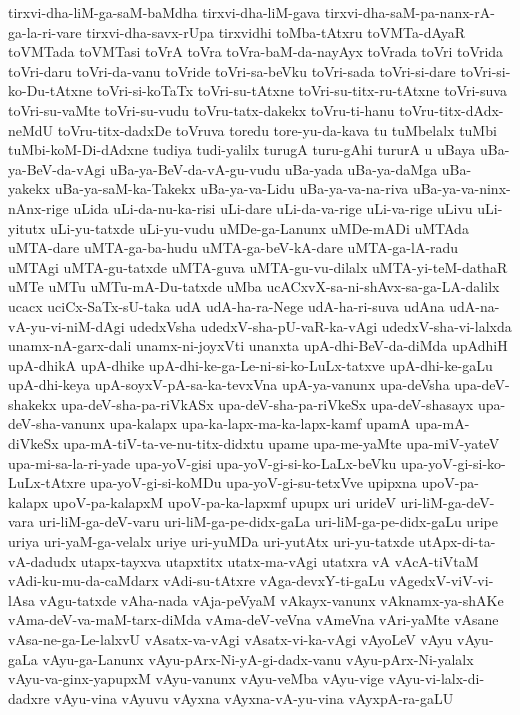 {tirxvi-dha-liM-ga-saM-baMdha
tirxvi-dha-liM-gava
tirxvi-dha-saM-pa-nanx-rA-ga-la-ri-vare
tirxvi-dha-savx-rUpa
tirxvidhi
toMba-tAtxru
toVMTa-dAyaR
toVMTada
toVMTasi
toVrA
toVra
toVra-baM-da-nayAyx
toVrada
toVri
toVrida
toVri-daru
toVri-da-vanu
toVride
toVri-sa-beVku
toVri-sada
toVri-si-dare
toVri-si-ko-Du-tAtxne
toVri-si-koTaTx
toVri-su-tAtxne
toVri-su-titx-ru-tAtxne
toVri-suva
toVri-su-vaMte
toVri-su-vudu
toVru-tatx-dakekx
toVru-ti-hanu
toVru-titx-dAdx-neMdU
toVru-titx-dadxDe
toVruva
toredu
tore-yu-da-kava
tu
tuMbelalx
tuMbi
tuMbi-koM-Di-dAdxne
tudiya
tudi-yalilx
turugA
turu-gAhi
tururA
u
uBaya
uBa-ya-BeV-da-vAgi
uBa-ya-BeV-da-vA-gu-vudu
uBa-yada
uBa-ya-daMga
uBa-yakekx
uBa-ya-saM-ka-Takekx
uBa-ya-va-Lidu
uBa-ya-va-na-riva
uBa-ya-va-ninx-nAnx-rige
uLida
uLi-da-nu-ka-risi
uLi-dare
uLi-da-va-rige
uLi-va-rige
uLivu
uLi-yitutx
uLi-yu-tatxde
uLi-yu-vudu
uMDe-ga-Lanunx
uMDe-mADi
uMTAda
uMTA-dare
uMTA-ga-ba-hudu
uMTA-ga-beV-kA-dare
uMTA-ga-lA-radu
uMTAgi
uMTA-gu-tatxde
uMTA-guva
uMTA-gu-vu-dilalx
uMTA-yi-teM-dathaR
uMTe
uMTu
uMTu-mA-Du-tatxde
uMba
ucACxvX-sa-ni-shAvx-sa-ga-LA-dalilx
ucacx
uciCx-SaTx-sU-taka
udA
udA-ha-ra-Nege
udA-ha-ri-suva
udAna
udA-na-vA-yu-vi-niM-dAgi
udedxVsha
udedxV-sha-pU-vaR-ka-vAgi
udedxV-sha-vi-lalxda
unamx-nA-garx-dali
unamx-ni-joyxVti
unanxta
upA-dhi-BeV-da-diMda
upAdhiH
upA-dhikA
upA-dhike
upA-dhi-ke-ga-Le-ni-si-ko-LuLx-tatxve
upA-dhi-ke-gaLu
upA-dhi-keya
upA-soyxV-pA-sa-ka-tevxVna
upA-ya-vanunx
upa-deVsha
upa-deV-shakekx
upa-deV-sha-pa-riVkASx
upa-deV-sha-pa-riVkeSx
upa-deV-shasayx
upa-deV-sha-vanunx
upa-kalapx
upa-ka-lapx-ma-ka-lapx-kamf
upamA
upa-mA-diVkeSx
upa-mA-tiV-ta-ve-nu-titx-didxtu
upame
upa-me-yaMte
upa-miV-yateV
upa-mi-sa-la-ri-yade
upa-yoV-gisi
upa-yoV-gi-si-ko-LaLx-beVku
upa-yoV-gi-si-ko-LuLx-tAtxre
upa-yoV-gi-si-koMDu
upa-yoV-gi-su-tetxVve
upipxna
upoV-pa-kalapx
upoV-pa-kalapxM
upoV-pa-ka-lapxmf
upupx
uri
urideV
uri-liM-ga-deV-vara
uri-liM-ga-deV-varu
uri-liM-ga-pe-didx-gaLa
uri-liM-ga-pe-didx-gaLu
uripe
uriya
uri-yaM-ga-velalx
uriye
uri-yuMDa
uri-yutAtx
uri-yu-tatxde
utApx-di-ta-vA-dadudx
utapx-tayxva
utapxtitx
utatx-ma-vAgi
utatxra
vA
vAcA-tiVtaM
vAdi-ku-mu-da-caMdarx
vAdi-su-tAtxre
vAga-devxY-ti-gaLu
vAgedxV-viV-vi-lAsa
vAgu-tatxde
vAha-nada
vAja-peVyaM
vAkayx-vanunx
vAknamx-ya-shAKe
vAma-deV-va-maM-tarx-diMda
vAma-deV-veVna
vAmeVna
vAri-yaMte
vAsane
vAsa-ne-ga-Le-lalxvU
vAsatx-va-vAgi
vAsatx-vi-ka-vAgi
vAyoLeV
vAyu
vAyu-gaLa
vAyu-ga-Lanunx
vAyu-pArx-Ni-yA-gi-dadx-vanu
vAyu-pArx-Ni-yalalx
vAyu-va-ginx-yapupxM
vAyu-vanunx
vAyu-veMba
vAyu-vige
vAyu-vi-lalx-di-dadxre
vAyu-vina
vAyuvu
vAyxna
vAyxna-vA-yu-vina
vAyxpA-ra-gaLU
}
